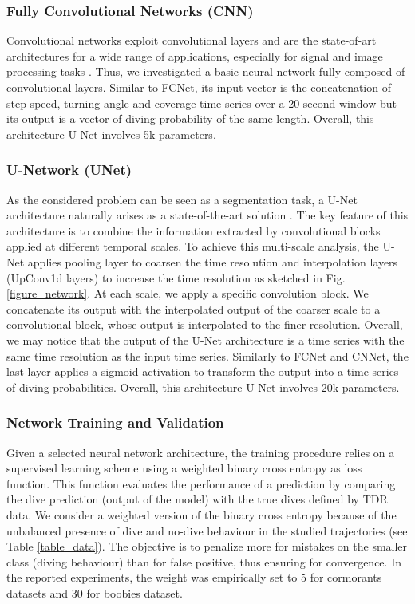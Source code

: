 \documentclass{article}
\begin{document}
\newpage

\subsubsection{Fully Convolutional Networks (CNN)}
Convolutional networks exploit convolutional layers and are the state-of-art architectures for a wide range of applications, especially for signal and image processing tasks \cite{alom_state---art_2019}. Thus, we investigated a basic neural network fully composed of convolutional layers. Similar to FCNet, its input vector is the concatenation of step speed, turning angle and coverage time series over a 20-second window but its output is a vector of diving probability of the same length. Overall, this architecture U-Net involves 5k parameters.

\subsubsection{U-Network (UNet)}
As the considered problem can be seen as a segmentation task, a U-Net architecture naturally arises as a state-of-the-art solution \cite{ronneberger_u-net_2015}. The key feature of this architecture is to combine the information extracted by convolutional blocks applied at different temporal scales. To achieve this multi-scale analysis, the U-Net applies pooling layer to coarsen the time resolution and interpolation layers (UpConv1d layers) to increase the time resolution as sketched in Fig.\ref{figure_network}. At each scale, we apply a specific convolution block. We concatenate its output with the interpolated output of the coarser scale to a convolutional block, whose output is interpolated to the finer resolution. Overall, we may notice that the output of the U-Net architecture is a time series with the same time resolution as the input time series. Similarly to FCNet and CNNet, the last layer applies a sigmoid activation to transform the output into a time series of diving probabilities. Overall, this architecture U-Net involves 20k parameters.

\subsubsection{Network Training and Validation}
Given a selected neural network architecture, the training procedure relies on a supervised learning scheme using a weighted binary cross entropy as loss function. This function evaluates the performance of a prediction by comparing the dive prediction (output of the model) with the true dives defined by TDR data. We consider a weighted version of the binary cross entropy because of the unbalanced presence of dive and no-dive behaviour in the studied trajectories (see Table \ref{table_data}). The objective is to penalize more for mistakes on the smaller class (diving behaviour) than for false positive, thus ensuring for convergence. In the reported experiments, the weight was empirically set to 5 for cormorants datasets and 30 for boobies dataset.
\end{document}
